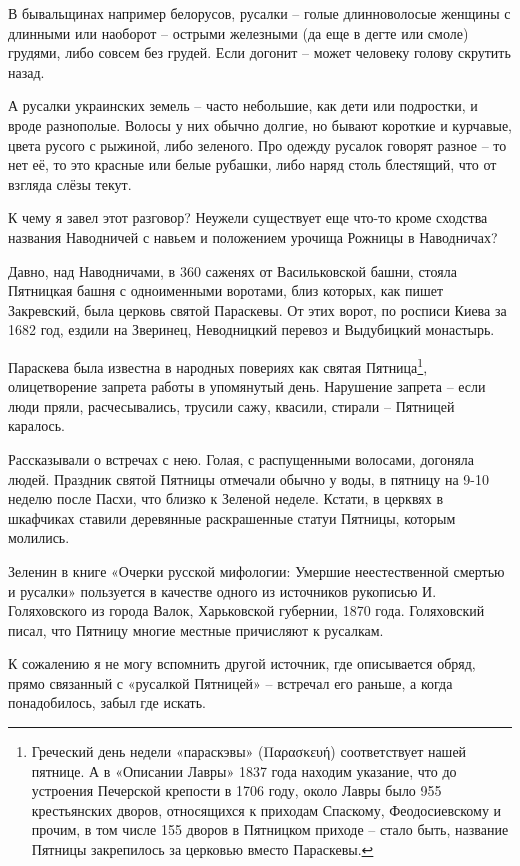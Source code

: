В бывальщинах например белорусов, русалки – голые длинноволосые женщины с длинными или наоборот – острыми железными (да еще в дегте или смоле) грудями, либо совсем без грудей. Если догонит – может человеку голову скрутить назад. 

А русалки украинских земель – часто небольшие, как дети или подростки, и вроде разнополые. Волосы у них обычно долгие, но бывают короткие и курчавые, цвета русого с рыжиной, либо зеленого. Про одежду русалок говорят разное – то нет её, то это красные или белые рубашки, либо наряд столь блестящий, что от взгляда слёзы текут.

К чему я завел этот разговор? Неужели существует еще что-то кроме сходства названия Наводничей с навьем и положением урочища Рожницы в Наводничах?

Давно, над Наводничами, в 360 саженях от Васильковской башни, стояла Пятницкая башня с одноименными воротами, близ которых, как пишет Закревский, была церковь святой Параскевы. От этих ворот, по росписи Киева за 1682 год, ездили на Зверинец, Неводницкий перевоз и Выдубицкий монастырь.

Параскева была известна в народных повериях как святая Пятница\footnote{Греческий день недели «параскэвы» (Παρασκευή) соответствует нашей пятнице. А в «Описании Лавры» 1837 года находим указание, что до устроения Печерской крепости в 1706 году, около Лавры было 955 крестьянских дворов, относящихся к приходам Спаскому, Феодосиевскому и прочим, в том числе 155 дворов в Пятницком приходе – стало быть, название Пятницы закрепилось за церковью вместо Параскевы.}, олицетворение запрета работы в упомянутый день. Нарушение запрета – если люди пряли, расчесывались, трусили сажу, квасили, стирали – Пятницей каралось. 

Рассказывали о встречах с нею. Голая, с распущенными волосами, догоняла людей. Праздник святой Пятницы отмечали обычно у воды, в пятницу на 9-10 неделю после Пасхи, что близко к Зеленой неделе. Кстати, в церквях в шкафчиках ставили деревянные раскрашенные статуи Пятницы, которым молились.

Зеленин в книге «Очерки русской мифологии: Умершие неестественной смертью и русалки»\cite{zeleninrusalki} пользуется в качестве одного из источников рукописью И. Голяховского из города Валок, Харьковской губернии, 1870 года. Голяховский писал, что Пятницу многие местные причисляют к русалкам. 

К сожалению я не могу вспомнить другой источник, где описывается обряд, прямо связанный с «русалкой Пятницей» – встречал его раньше, а когда понадобилось, забыл где искать.

